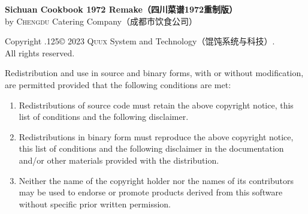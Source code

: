 %
%
%
%
%
%
%
\begingroup%

\footnotesize%
\singlespacing%
\setlength{\parindent}{0pt}%
\setlength{\parskip}{.1875\baselineskip}%
{\sffamily\bfseries Sichuan Cookbook 1972 Remake\!（四川菜谱1972重制版）}\\%
by \textsc{Chengdu} Catering Company\!（成都市饮食公司）

\null

Copyright {\lower.125\baselineskip\hbox{\copyright}} 2023
\textsc{Quux} System and Technology\!（馄饨系统与科技）\!\!\!.\\%
All rights reserved.

Redistribution and use in source and binary forms, with or without
modification, are permitted provided that the following conditions are met:

\begin{enumerate}
\item Redistributions of source code must retain the above copyright notice,
      this list of conditions and the following disclaimer.

\item Redistributions in binary form must reproduce the above copyright notice,
      this list of conditions and the following disclaimer in the documentation
      and\slash or other materials provided with the distribution.

\item Neither the name of the copyright holder nor the names of its
      contributors may be used to endorse or promote products derived from
      this software without specific prior written permission.
\end{enumerate}

